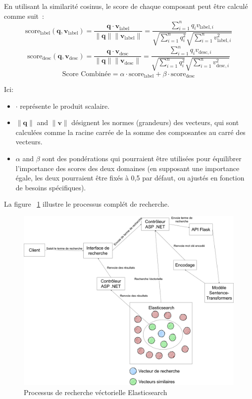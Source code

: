 \noindent
En utilisant la similarité cosinus, le score de chaque composant peut être calculé comme suit :
\[
	\text{score}_{\text{label}}(\mathbf{q}, \mathbf{v}_{\text{label}}) = \frac{\mathbf{q} \cdot \mathbf{v}_{\text{label}}}{\|\mathbf{q}\| \|\mathbf{v}_{\text{label}}\|} = \frac{\sum_{i=1}^n q_i v_{\text{label}, i}}{\sqrt{\sum_{i=1}^n q_i^2} \sqrt{\sum_{i=1}^n v_{\text{label}, i}^2}}
\]
\[
	\text{score}_{\text{desc}}(\mathbf{q}, \mathbf{v}_{\text{desc}}) = \frac{\mathbf{q} \cdot \mathbf{v}_{\text{desc}}}{\|\mathbf{q}\| \|\mathbf{v}_{\text{desc}}\|} = \frac{\sum_{i=1}^n q_i v_{\text{desc}, i}}{\sqrt{\sum_{i=1}^n q_i^2} \sqrt{\sum_{i=1}^n v_{\text{desc}, i}^2}}
\]
\[
	\text{Score Combinée} = \alpha \cdot \text{score}_{\text{label}} + \beta \cdot \text{score}_{\text{desc}}
\]

\noindent
Ici:
\begin{itemize}
	\item \( \cdot \) représente le produit scalaire.
	\item \( \|\mathbf{q}\| \) and \( \|\mathbf{v}\| \) désignent les normes (grandeurs) des vecteurs, qui sont calculées comme la racine carrée de la somme des composantes au carré des vecteurs.
	\item \( \alpha \) and \( \beta \) sont des pondérations qui pourraient être utilisées pour équilibrer l'importance des scores des deux domaines (en supposant une importance égale, les deux pourraient être fixés à 0,5 par défaut, ou ajustés en fonction de besoins spécifiques).
\end{itemize}

\noindent
La figure ~\ref{fig:vectorsearch} illustre le processus complét de recherche.

\begin{figure}[H]
	\centering
	\includegraphics[width=1\textwidth]{logos/vectorsearch.png}
	\caption{Processus de recherche véctorielle Elasticsearch}
	\label{fig:vectorsearch}
\end{figure}


